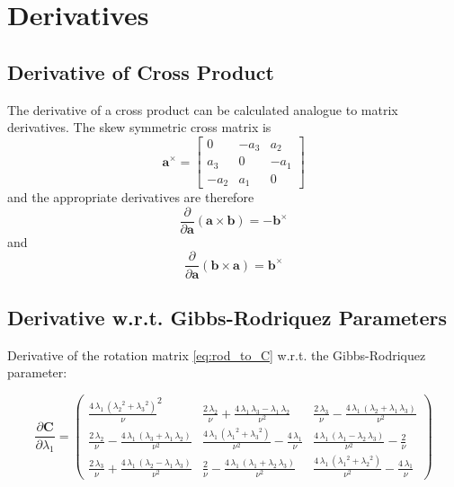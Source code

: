\chapter{Derivatives}
\label{app:derivatives}

\section{Derivative of Cross Product}
\label{sec:app_d_cross_product}
The derivative of a cross product can be calculated analogue to matrix derivatives.
The skew symmetric cross matrix is
\begin{equation}
\mathbf{a}^\times = \left[
\begin{array}{ccc}
0 & -a_3 & a_2 \\
a_3 & 0 & -a_1 \\
-a_2 & a_1 & 0
\end{array} \right]
\end{equation}
and the appropriate derivatives are therefore
\begin{equation}
\frac{\partial}{\partial \mathbf{a}} \left( \mathbf{a} \times \mathbf{b} \right)
= - \mathbf{b}^\times
\end{equation}
and
\begin{equation}
\frac{\partial}{\partial \mathbf{a}} \left( \mathbf{b} \times \mathbf{a} \right)
=  \mathbf{b}^\times
\end{equation}

\section{Derivative w.r.t. Gibbs-Rodriquez Parameters}
\label{sec:app_dwrt_rodriquez}
Derivative of the rotation matrix \cref{eq:rod_to_C} w.r.t. the Gibbs-Rodriquez parameter:

\begin{equation*}
\frac{\partial \mathbf{C}}{\partial \lambda_1} = 
\left(\begin{array}{ccc} 
\frac{4\, {\lambda_1}\, \left({{\lambda_2}}^2 + {{\lambda_3}}^2\right)}{\nu}^2 & 
\frac{2\, {\lambda_2}}{\nu} + \frac{4\, {\lambda_1}\, {\lambda_3} - {\lambda_1}\, {\lambda_2}}{\nu^2} & 
\frac{2\, {\lambda_3}}{\nu} - \frac{4\, {\lambda_1}\, \left({\lambda_2} + {\lambda_1}\, {\lambda_3}\right)}{\nu^2}\\ 
\frac{2\, {\lambda_2}}{\nu} - \frac{4\, {\lambda_1}\, \left({\lambda_3} + {\lambda_1}\, {\lambda_2}\right)}{\nu^2} & 
\frac{4\, {\lambda_1}\, \left({{\lambda_1}}^2 + {{\lambda_3}}^2\right)}{\nu^2} - \frac{4\, {\lambda_1}}{\nu} &
\frac{4\, {\lambda_1}\, \left({\lambda_1} - {\lambda_2}\, {\lambda_3}\right)}{\nu^2} - \frac{2}{\nu}\\
\frac{2\, {\lambda_3}}{\nu} + \frac{4\, {\lambda_1}\, \left({\lambda_2} - {\lambda_1}\, {\lambda_3}\right)}{\nu^2} &
\frac{2}{\nu} - \frac{4\, {\lambda_1}\, \left({\lambda_1} + {\lambda_2}\, {\lambda_3}\right)}{\nu^2} & \frac{4\, {\lambda_1}\, \left({{\lambda_1}}^2 + {{\lambda_2}}^2\right)}{\nu^2} - \frac{4\, {\lambda_1}}{\nu}
\end{array}\right)
\end{equation*}

